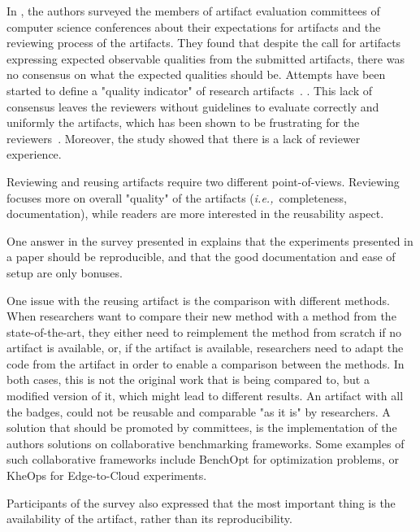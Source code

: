 \documentclass[sigconf,natbib=false]{acmart}
\newcommand{\ie}{\emph{i.e.,}}
\newcommand{\todo}[1]{{\color{red}{TODO: #1}}}
\begin{document}
In \cite{hermann2020community}, the authors surveyed the members of artifact evaluation committees of computer science conferences about their expectations for artifacts and the reviewing process of the artifacts. 
They found that despite the call for artifacts expressing expected observable qualities from the submitted artifacts, there was no consensus on what the expected qualities should be.
Attempts have been started to define a "quality indicator" of research artifacts\ \cite{castell2024towards}.
\todo{more}.
This lack of consensus leaves the reviewers without guidelines to evaluate correctly and uniformly the artifacts, which has been shown to be frustrating for the reviewers\ \cite{beller2020will}.
Moreover, the study showed that there is a lack of reviewer experience.

Reviewing and reusing artifacts require two different point-of-views.
Reviewing focuses more on overall "quality" of the artifacts (\ie\ completeness, documentation), while readers are more interested in the reusability aspect.

One answer in the survey presented in \cite{hermann2020community} explains that the experiments presented in a paper should be reproducible, and that the good documentation and ease of setup are only bonuses.

One issue with the reusing artifact is the comparison with different methods.
When researchers want to compare their new method with a method from the state-of-the-art, they either need to reimplement the method from scratch if no artifact is available, or, if the artifact is available, researchers need to adapt the code from the artifact in order to enable a comparison between the methods.
In both cases, this is not the original work that is being compared to, but a modified version of it, which might lead to different results.
An artifact with all the badges, could not be reusable and comparable "as it is" by researchers.
A solution that should be promoted by committees, is the implementation of the authors solutions on collaborative benchmarking frameworks.
Some examples of such collaborative frameworks include BenchOpt \cite{moreau2022benchopt} for optimization problems, or KheOps \cite{rosendo2023kheops} for Edge-to-Cloud experiments.



Participants of the survey also expressed that the most important thing is the availability of the artifact, rather than its reproducibility.
\end{document}
